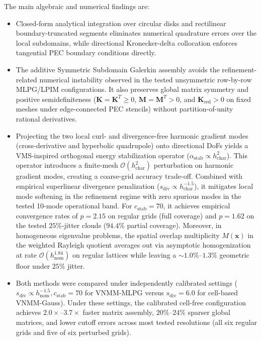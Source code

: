 \documentclass[VANCOUVER,Times1COL]{WileyNJD-v5}
\begin{document}
The main algebraic and numerical findings are:
\begin{itemize}
    \item Closed-form analytical integration over circular disks and rectilinear boundary-truncated segments eliminates numerical quadrature errors over the local subdomains, while directional Kronecker-delta collocation enforces tangential PEC boundary conditions directly.
    \item The additive Symmetric Subdomain Galerkin assembly avoids the refinement-related numerical instability observed in the tested unsymmetric row-by-row MLPG/LPIM configurations. It also preserves global matrix symmetry and positive semidefiniteness ($\mathbf{K} = \mathbf{K}^T \ge 0$, $\mathbf{M} = \mathbf{M}^T > 0$, and $\mathbf{K}_{\mathrm{red}} > 0$ on fixed meshes under edge-connected PEC stencils) without partition-of-unity rational derivatives.
    \item Projecting the two local curl- and divergence-free harmonic gradient modes (cross-derivative and hyperbolic quadrupole) onto directional DoFs yields a VMS-inspired orthogonal energy stabilization operator ($\alpha_{\mathrm{stab}} \propto h_{\mathrm{char}}^2$). This operator introduces a finite-mesh $\mathcal{O}(h_{\mathrm{char}}^2)$ perturbation on harmonic gradient modes, creating a coarse-grid accuracy trade-off. Combined with empirical superlinear divergence penalization ($s_{\mathrm{div}} \propto h_{\mathrm{char}}^{-1.5}$), it mitigates local mode softening in the refinement regime with zero spurious modes in the tested 10-mode operational band. For $c_{\mathrm{stab}} = 70$, it achieves empirical convergence rates of $p = 2.15$ on regular grids (full coverage) and $p = 1.62$ on the tested $25\%$-jitter clouds ($94.4\%$ partial coverage). Moreover, in homogeneous eigenvalue problems, the spatial overlap multiplicity $M(\mathbf{x})$ in the weighted Rayleigh quotient averages out via asymptotic homogenization at rate $\mathcal{O}(h_{\mathrm{nom}}^{1.84})$ on regular lattices while leaving a $\sim 1.0\%\text{--}1.3\%$ geometric floor under $25\%$ jitter.
    \item Both methods were compared under independently calibrated settings ($s_{\mathrm{div}} \propto h_{\mathrm{nom}}^{-1.5}, c_{\mathrm{stab}} = 70$ for VNMM-MLPG versus $s_{\mathrm{div}} = 6.0$ for cell-based VNMM-Gauss). Under these settings, the calibrated cell-free configuration achieves $2.0\times\text{--}3.7\times$ faster matrix assembly, $20\%\text{--}24\%$ sparser global matrices, and lower cutoff errors across most tested resolutions (all six regular grids and five of six perturbed grids).
\end{itemize}
\end{document}
